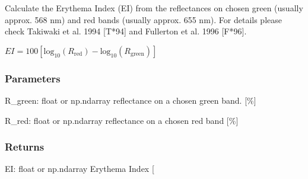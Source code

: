 \documentclass[letterpaper,10pt,english]{sphinxmanual}
\begin{document}
\begin{fulllineitems}
\label{\detokenize{07_colors:skinoptics.colors.EI}}
\pysigstartsignatures
{}
\pysigstopsignatures
\sphinxAtStartPar
Calculate the Erythema Index (EI) from the reflectances on chosen green 
(usually approx. 568 nm) and red bands (usually approx. 655 nm).
For details please check Takiwaki et al. 1994 {[}T*94{]} and Fullerton et al. 1996 {[}F*96{]}.

\sphinxAtStartPar
\(EI = 100[\mbox{log}_{10}(R_\mbox{red}) - \mbox{log}_{10}(R_\mbox{green})]\)


\subsubsection{Parameters}
\label{\detokenize{07_colors:id7}}
\sphinxAtStartPar
R\_green: float or np.ndarray
reflectance on a chosen green band. {[}\%{]}

\sphinxAtStartPar
R\_red: float or np.ndarray
reflectance on a chosen red band {[}\%{]}


\subsubsection{Returns}
\label{\detokenize{07_colors:id8}}
\sphinxAtStartPar
EI: float or np.ndarray
Erythema Index {[}\sphinxhyphen{}{]}

\end{fulllineitems}

\end{document}
